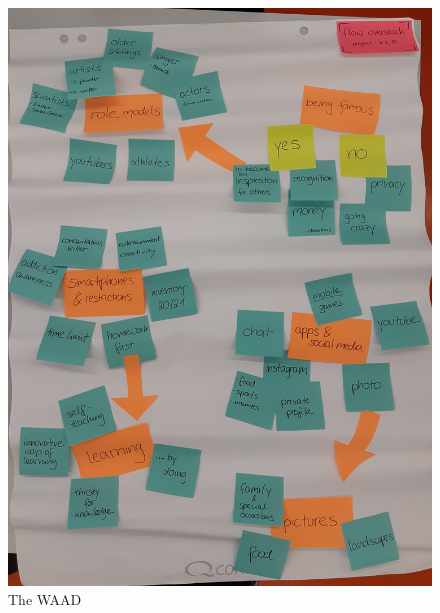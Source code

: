 \documentclass[12pt]{scrartcl}
\begin{document}
	
\begin{figure}[h]
	\includegraphics[width=\textwidth]{WAAD.jpg}
	\caption{The WAAD}
	\label{WAAD}
\end{figure}
\end{document}
